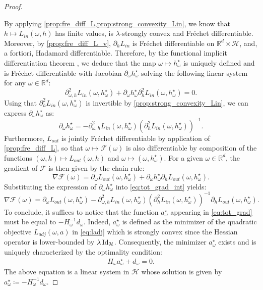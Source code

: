 \begin{proof}\label{proof:eq:tot_grad}

By applying \cref{prop:fre_diff_L,prop:strong_convexity_Lin},  
we know that $h\mapsto L_{in}(\omega,h)$ has finite values, is $\lambda$-strongly convex and Fr\'echet differentiable. Moreover, by \cref{prop:fre_diff_L_v}, $\partial_h L_{in}$ is Fr\'echet differentiable on ${\mathbb{R}^d}\times\mathcal{H}$, and, a fortiori, Hadamard differentiable. Therefore, by the functional implicit differentiation theorem  \citep{ioffe1979theory}, we deduce that the map $\omega\mapsto h_{\omega}^{\star}$ is uniquely defined and is Fr\'echet differentiable with Jacobian $\partial_\omega h^\star_\omega$ solving the following linear system for any $\omega \in{\mathbb{R}^d}$:
\begin{equation*}
    \partial_{\omega,h}^2 L_{in}(\omega, h^\star_\omega) + \partial_\omega h^\star_\omega\partial_h^2 L_{in}(\omega, h^\star_\omega)=0.
\end{equation*}
Using that $\partial_h^2 L_{in}(\omega, h^\star_\omega)$ is invertible by \cref{prop:strong_convexity_Lin}, we can express $\partial_\omega h^\star_\omega$ as:  
\begin{equation*}
    \partial_\omega h^\star_\omega=-\partial_{\omega,h}^2 L_{in}(\omega, h^\star_\omega)\left(\partial_h^2 L_{in}(\omega, h^\star_\omega)\right)^{-1}.
\end{equation*}
Furthermore, $L_{out}$ is jointly Fr\'echet differentiable by application of \cref{prop:fre_diff_L}, so that $\omega\mapsto\mathcal{F}(\omega)$ is also differentiable by composition of the functions {$(\omega,h)\mapsto L_{out}(\omega, h)$ and $\omega\mapsto (\omega,h^\star_\omega)$}. 
For a given $\omega\in {\mathbb{R}^d}$, the gradient of $\mathcal{F}$ is then given by the chain rule: 
\begin{equation}\label{eq:tot_grad_int}
    \nabla\mathcal{F}(\omega)=\partial_\omega L_{out}(\omega, h^\star_\omega)+\partial_\omega h^\star_\omega\partial_h L_{out}(\omega, h^\star_\omega).
\end{equation}
Substituting the expression of $\partial_\omega h^\star_\omega$ into \cref{eq:tot_grad_int} yields:
\begin{equation*}
    \nabla\mathcal{F}(\omega)=\partial_\omega L_{out}(\omega, h^\star_\omega)-\partial_{\omega,h}^2 L_{in}(\omega, h^\star_\omega)\left(\partial_h^2 L_{in}(\omega, h^\star_\omega)\right)^{-1}\partial_h L_{out}(\omega, h^\star_\omega).
\end{equation*}
To conclude, it suffices to notice that the function $a_\omega^{\star}$ appearing in \cref{eq:tot_grad} must be equal to $-H_{\omega}^{-1}d_{\omega}$. Indeed, $a_\omega^{\star}$ is defined as the minimizer of the quadratic objective $L_{adj}(\omega,a)$ in \cref{eq:ladj} which is strongly convex since the Hessian operator is lower-bounded by $\lambda \operatorname{Id}_{\mathcal{H}}$. Consequently, the minimizer $a_\omega^{\star}$ exists and is uniquely characterized by the optimality condition:
\begin{align*}
	H_{\omega}a_\omega^{\star}+d_{\omega}=0. 
\end{align*}
The above equation is a linear system in $\mathcal{H}$ whose solution is given by $a_\omega^{\star}\coloneqq-H_{\omega}^{-1}d_{\omega}$.
\end{proof}